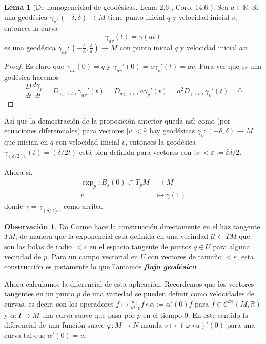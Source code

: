 \documentclass[spanish]{book}
\theoremstyle{definition}
\newtheorem*{lema}{Lema}
\newtheorem*{obs}{Observación}
\newcommand{\R}{\mathbb{R}}
\newcommand{\Cinf}{C^\infty}
\begin{document}
	\begin{lema}[De homogeneidad de geodésicas. Lema 2.6 \cite{DoCarmo}, Coro. 14.6 \cite{Loring-dif}]
		Sea $a\in\R$. Si una geodésica $\gamma_v:(-\delta,\delta)\to M$ tiene punto inicial $q$ y velocidad inicial $v$, entonces la curva
		\[\gamma_{av}(t)=\gamma(at)\]
		es una geodésica $\gamma_{av}:(-\frac{\delta}{a},\frac{\delta}{a})\to M$ con punto inicial $q$ y velocidad inicial $av$.
	\end{lema}
	\begin{proof}
		Es claro que $\gamma_{av}(0)=q$ y $\gamma_{av}'(0)=a\gamma_v'(t)=av$. Para ver que es una godésica hacemos
		\[\frac{D}{dt}\frac{d\gamma_v}{dt}=D_{{\gamma_{av}'}(t)}\gamma_{av}'(t)=D_{a\gamma_v'(t)}a\gamma_v'(t)=a^2D_{\gamma'(t)}\gamma_v'(t)=0\]
	\end{proof}
	
	Así que la demostración de la proposición anterior queda así: como (por ecuaciones diferenciales) para vectores $|v|<\hat{\varepsilon}$ hay geodésicas $\gamma_v:(-\delta,\delta)\to M$ que inician en $q$ con velocidad inicial $v$, entonces la geodésica $\gamma_{(\delta/2)v}(t)=(\delta/2t)$ está bien definida para vectores con $|v|<\varepsilon:=\hat{\varepsilon}\delta/2$.
	
	Ahora sí,
	\begin{align*}
		\exp_p:B_{\varepsilon}(0)\subset T_pM&\to M\\
		v&\mapsto \gamma(1)
	\end{align*}
	donde $\gamma=\gamma_{(\delta/2)v}$ como arriba.
	\begin{obs}
		Do Carmo hace la construcción directamente en el haz tangente $TM$, de manera que la exponencial está definida en una vecindad $\mathcal{U}\subset TM$ que son las bolas de radio $<\varepsilon$ en el espacio tangente de puntos $q\in U$ para alguna vecindad de $p$. Para un campo vectorial en $U$ con vectores de tamaño $<\varepsilon$, esta construcción es justamente lo que llamamos \textbf{\textit{flujo geodésico}}.
	\end{obs}
	
	Ahora calculamos la diferencial de esta aplicación. Recordemos que los vectores tangentes en un punto $p$ de una variedad se pueden definir como velocidades de curvas, es decir, son los operadores $f\mapsto \frac{d}{dt}\big|_0f\circ\alpha:=\alpha'(0)f$ para $f\in\Cinf(M,\R)$ y $\alpha:I\to M$ una curva suave que pasa por $p$ en el tiempo 0. En este sentido la diferencial de una función suave $\varphi:M\to N$ manda $v\mapsto (\varphi\circ\alpha)'(0)$ para una curva tal que $\alpha'(0)=v$.
	
\end{document}
